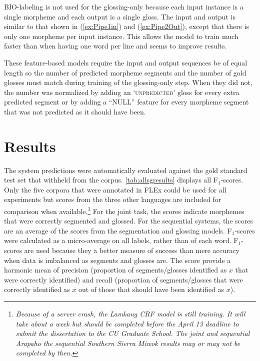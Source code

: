 BIO-labeling is not used for the glossing-only because each input instance is a single morpheme and each output is a single gloss. The input and output is similar to that shown in (\ref{ex:Pipe1in}) and (\ref{ex:Pipe2Out}), except that there is only one morpheme per input instance. This allows the model to train much faster than when having one word per line and seems to improve results.

These feature-based models require the input and output sequences be of equal length so the number of predicted morpheme segments and the number of gold glosses must match during training of the glossing-only step. When they did not, the number was normalized by adding an `\textsc{unpredicted}' gloss for every extra predicted segment or by adding a ``NULL'' feature for every morpheme segment that was not predicted as it should have been. 


\section{Results}
\label{sec:sgresults}

The system predictions were automatically evaluated against the gold standard test set that withheld from the corpus. \autoref{tab:allsgresults} displays all F$_1$-scores. Only the five corpora that were annotated in FLEx could be used for all experiments but scores from the three other languages are included for comparison when available.\footnote{\textit{Because of a server crash, the Lamkang CRF model is still training. It will take about a week but should be completed before the April 13 deadline to submit the dissertation to the CU Graduate School. The joint and sequential Arapaho the sequential Southern Sierra Miwok results may or may not be completed by then.}} For the joint task, the scores indicate morphemes that were correctly segmented and glossed. For the sequential systems, the scores are an average of the scores from the segmentation and glossing models. F$_1$-scores were calculated as a micro-average on all labels, rather than of each word. F$_1$-scores are used because they a better measure of success than mere accuracy when data is imbalanced as segments and glosses are. The score provide a harmonic mean of precision (proportion of segments/glosses identified as $x$ that were correctly identified) and recall (proportion of segments/glosses that were correctly identified as $x$ out of those that should have been identified as $x$). 


